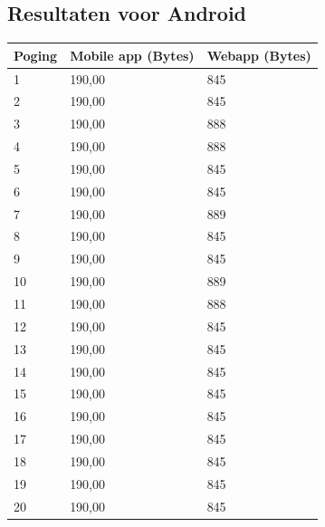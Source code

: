 \documentclass[pdftex,a4paper,12pt,twoside]{report}
\begin{document}
\subsection{Resultaten voor Android}
\begin{center}
  \begin{tabular}{ | l | l | l |}
      \hline
      Poging & Mobile app (Bytes) & Webapp (Bytes)
      \\ \hline
      1 & 190,00 & 845
      \\ \hline
      2 & 190,00 & 845
      \\ \hline
      3 & 190,00 & 888
      \\ \hline
      4 & 190,00 & 888
      \\ \hline
      5 & 190,00 & 845
      \\ \hline
      6 & 190,00 & 845
      \\ \hline
      7 & 190,00 & 889
      \\ \hline
      8 & 190,00 & 845
      \\ \hline
      9 & 190,00 & 845
      \\ \hline
      10 & 190,00 & 889
      \\ \hline
      11 & 190,00 & 888
      \\ \hline
      12 & 190,00 & 845
      \\ \hline
      13 & 190,00 & 845
      \\ \hline
      14 & 190,00 & 845
      \\ \hline
      15 & 190,00 & 845
      \\ \hline
      16 & 190,00 & 845
      \\ \hline
      17 & 190,00 & 845
      \\ \hline
      18 & 190,00 & 845
      \\ \hline
      19 & 190,00 & 845
      \\ \hline
      20 & 190,00 & 845
      \\ \hline
  \end{tabular}
\end{center}
\newpage
\end{document}
